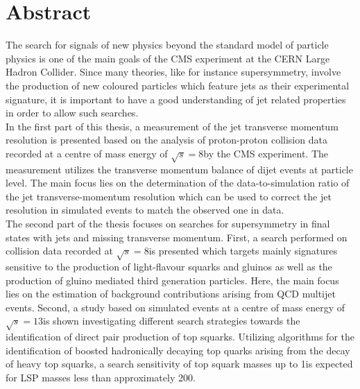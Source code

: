 \section*{Abstract}
The search for signals of new physics beyond the standard model of particle physics is one of the main goals of the CMS experiment at the CERN Large Hadron Collider. Since many theories, like for instance supersymmetry, involve the production of new coloured particles which feature jets as their experimental signature, it is important to have a good understanding of jet related properties in order to allow such searches.\\
In the first part of this thesis, a measurement of the jet transverse momentum resolution is presented based on the analysis of proton-proton collision data recorded at a centre of mass energy of $\sqrt{s}=8$\tev by the CMS experiment. The measurement utilizes the transverse momentum balance of dijet events at particle level. The main focus lies on the determination of the data-to-simulation ratio of the jet transverse-momentum resolution which can be used to correct the jet resolution in simulated events to match the observed one in data.\\
The second part of the thesis focuses on searches for supersymmetry in final states with jets and missing transverse momentum. First, a search performed on collision data recorded at $\sqrt{s}=8$\tev is presented which targets mainly signatures sensitive to the production of light-flavour squarks and gluinos as well as the production of gluino mediated third generation particles. Here, the main focus lies on the estimation of background contributions arising from QCD multijet events. Second, a study based on simulated events at a centre of mass energy of  $\sqrt{s}=13$\tev is shown investigating different search strategies towards the identification of direct pair production of top squarks. Utilizing algorithms for the identification of boosted hadronically decaying top quarks arising from the decay of heavy top squarks, a search sensitivity of top squark masses up to 1\tev is expected for LSP masses less than approximately 200\gev.   
